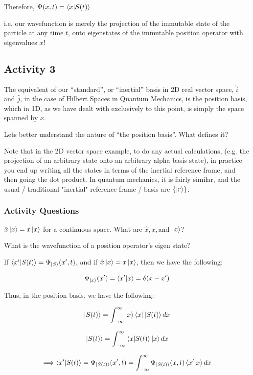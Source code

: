 \documentclass{article}
\begin{document}
Therefore, $\Psi(x,t) = \braket{x|S(t)}$

i.e. our wavefunction is merely the projection of the immutable state of the particle at any time $t$, onto eigenstates of the immutable position operator with eigenvalues $x$!


\subsection{Activity 3}

The equivalent of our “standard”, or “inertial” basis in 2D real vector space, $\hat{i}$ and $\hat{j}$, in the case of Hilbert Spaces in Quantum Mechanics, is the position basis, which in 1D, as we have dealt with exclusively to this point, is simply the space spanned by $x$.  

Lets better understand the nature of “the position basis”.  What defines it?


Note that in the 2D vector space example, to do any actual calculations, (e.g. the projection of an arbitrary state onto an arbitrary alpha basis state), in practice you end up writing all the states in terms of the inertial reference frame, and then going the dot product. In quantum mechanics, it is fairly similar, and the usual / traditional "inertial" reference frame / basis are $\{\ket{r}\}$. 

\subsubsection*{Activity Questions}

$\hat{x} \ket{x} = x \ket{x}$ for a continuous space. What are $\hat{x}, x, $and $\ket{x}$?

\hfill

What is the wavefunction of a position operator's eigen state?

If $\braket{x'|S(t)} = \Psi_{\ket{S}} (x',t)$, and if $\hat{x} \ket{x} = x \ket{x}$, then we have the following:

$$\Psi_{\ket{x}} (x') = \braket{x'|x} = \delta(x - x')$$

Thus, in the position basis, we have the following:

$$\ket{S(t)} = \int_{- \infty}^\infty \ket{x} \bra{x} \ket{S(t)} dx$$

$$\ket{S(t)} = \int_{- \infty}^\infty \braket{x|S(t)} \ket{x} dx$$

$$\Longrightarrow \braket{x'|S(t)} = \Psi_{\ket{S(t)}} (x',t) = \int_{- \infty}^\infty \Psi_{\ket{S(t)}} (x,t) \braket{x'|x} dx$$
\end{document}
